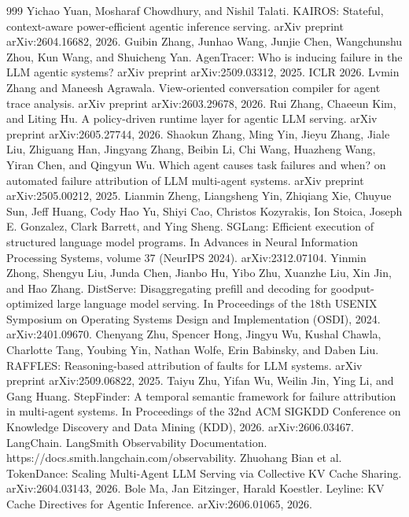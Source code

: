 \documentclass[preprint,12pt]{elsarticle}
\begin{document}
\begin{thebibliography}{999}
 Yichao Yuan, Mosharaf Chowdhury, and Nishil Talati. KAIROS: Stateful, context-aware power-efficient agentic inference serving. arXiv preprint arXiv:2604.16682, 2026.
 Guibin Zhang, Junhao Wang, Junjie Chen, Wangchunshu Zhou, Kun Wang, and Shuicheng Yan. AgenTracer: Who is inducing failure in the LLM agentic systems? arXiv preprint arXiv:2509.03312, 2025. ICLR 2026.
 Lvmin Zhang and Maneesh Agrawala. View-oriented conversation compiler for agent trace analysis. arXiv preprint arXiv:2603.29678, 2026.
 Rui Zhang, Chaeeun Kim, and Liting Hu. A policy-driven runtime layer for agentic LLM serving. arXiv preprint arXiv:2605.27744, 2026.
 Shaokun Zhang, Ming Yin, Jieyu Zhang, Jiale Liu, Zhiguang Han, Jingyang Zhang, Beibin Li, Chi Wang, Huazheng Wang, Yiran Chen, and Qingyun Wu. Which agent causes task failures and when? on automated failure attribution of LLM multi-agent systems. arXiv preprint arXiv:2505.00212, 2025.
 Lianmin Zheng, Liangsheng Yin, Zhiqiang Xie, Chuyue Sun, Jeff Huang, Cody Hao Yu, Shiyi Cao, Christos Kozyrakis, Ion Stoica, Joseph E. Gonzalez, Clark Barrett, and Ying Sheng. SGLang: Efficient execution of structured language model programs. In Advances in Neural Information Processing Systems, volume 37 (NeurIPS 2024). arXiv:2312.07104.
 Yinmin Zhong, Shengyu Liu, Junda Chen, Jianbo Hu, Yibo Zhu, Xuanzhe Liu, Xin Jin, and Hao Zhang. DistServe: Disaggregating prefill and decoding for goodput-optimized large language model serving. In Proceedings of the 18th USENIX Symposium on Operating Systems Design and Implementation (OSDI), 2024. arXiv:2401.09670.
 Chenyang Zhu, Spencer Hong, Jingyu Wu, Kushal Chawla, Charlotte Tang, Youbing Yin, Nathan Wolfe, Erin Babinsky, and Daben Liu. RAFFLES: Reasoning-based attribution of faults for LLM systems. arXiv preprint arXiv:2509.06822, 2025.
 Taiyu Zhu, Yifan Wu, Weilin Jin, Ying Li, and Gang Huang. StepFinder: A temporal semantic framework for failure attribution in multi-agent systems. In Proceedings of the 32nd ACM SIGKDD Conference on Knowledge Discovery and Data Mining (KDD), 2026. arXiv:2606.03467.
 LangChain. LangSmith Observability Documentation. https://docs.smith.langchain.com/observability.
 Zhuohang Bian et al. TokenDance: Scaling Multi-Agent LLM Serving via Collective KV Cache Sharing. arXiv:2604.03143, 2026.
 Bole Ma, Jan Eitzinger, Harald Koestler. Leyline: KV Cache Directives for Agentic Inference. arXiv:2606.01065, 2026.

\end{thebibliography}
\end{document}
